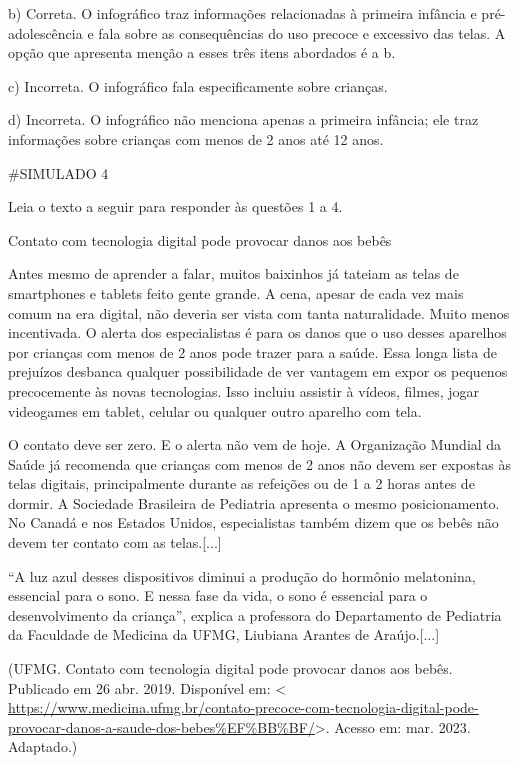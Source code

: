 b) Correta. O infográfico traz informações relacionadas à primeira
infância e pré-adolescência e fala sobre as consequências do uso precoce
e excessivo das telas. A opção que apresenta menção a esses três itens
abordados é a b.

c) Incorreta. O infográfico fala especificamente sobre crianças.

d) Incorreta. O infográfico não menciona apenas a primeira infância; ele
traz informações sobre crianças com menos de 2 anos até 12 anos.

\#SIMULADO 4

Leia o texto a seguir para responder às questões 1 a 4.

Contato com tecnologia digital pode provocar danos aos bebês﻿

Antes mesmo de aprender a falar, muitos baixinhos já tateiam as telas de
smartphones e tablets feito gente grande. A cena, apesar de cada vez
mais comum na era digital, não deveria ser vista com tanta naturalidade.
Muito menos incentivada. O alerta dos especialistas é para os danos que
o uso desses aparelhos por crianças com menos de 2 anos pode trazer para
a saúde. Essa longa lista de prejuízos desbanca qualquer possibilidade
de ver vantagem em expor os pequenos precocemente às novas tecnologias.
Isso incluiu assistir à vídeos, filmes, jogar videogames em tablet,
celular ou qualquer outro aparelho com tela.

O contato deve ser zero. E o alerta não vem de hoje. A Organização
Mundial da Saúde já recomenda que crianças com menos de 2 anos não devem
ser expostas às telas digitais, principalmente durante as refeições ou
de 1 a 2 horas antes de dormir. A Sociedade Brasileira de Pediatria
apresenta o mesmo posicionamento. No Canadá e nos Estados Unidos,
especialistas também dizem que os bebês não devem ter contato com as
telas.{[}...{]}

``A luz azul desses dispositivos diminui a produção do hormônio
melatonina, essencial para o sono. E nessa fase da vida, o sono é
essencial para o desenvolvimento da criança'', explica a professora do
Departamento de Pediatria da Faculdade de Medicina da UFMG, Liubiana
Arantes de Araújo.{[}...{]}

(UFMG. Contato com tecnologia digital pode provocar danos aos bebês﻿.
Publicado em 26 abr. 2019. Disponível em: \textless{}
\url{https://www.medicina.ufmg.br/contato-precoce-com-tecnologia-digital-pode-provocar-danos-a-saude-dos-bebes\%EF\%BB\%BF/}\textgreater.
Acesso em: mar. 2023. Adaptado.)

